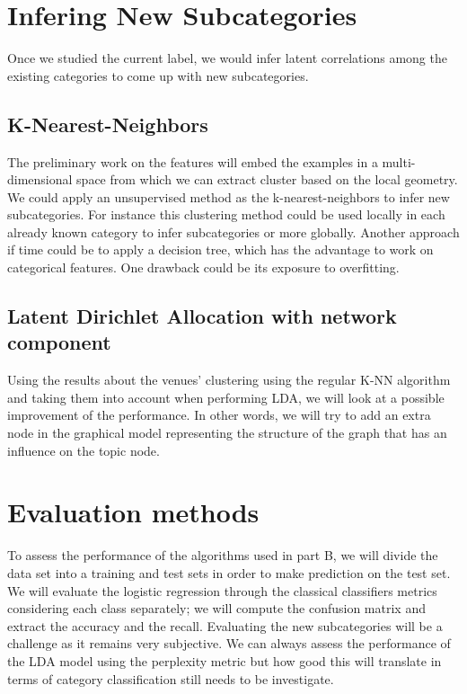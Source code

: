 \documentclass[submit]{harvardml}
\begin{document}
\section{Infering New Subcategories}

Once we studied the current label, we would infer latent correlations among the existing categories to come up with new subcategories.

\subsection{K-Nearest-Neighbors}
The preliminary work on the features will embed the examples in a multi-dimensional space from which we can extract cluster based on the local geometry. We could apply an unsupervised method as the k-nearest-neighbors to infer new subcategories. For instance this clustering method could be used locally in each already known category to infer subcategories or more globally. Another approach if time could be to apply a decision tree, which has the advantage to work on categorical features. One drawback could be its exposure to overfitting.

\subsection{Latent Dirichlet Allocation with network component}

Using the results about the venues' clustering using the regular K-NN algorithm and taking them into account when performing LDA, we will look at a possible improvement of the performance. In other words, we will try to add an extra node in the graphical model representing the structure of the graph that has an influence on the topic node.

\section{Evaluation methods}
 
To assess the performance of the algorithms used in part B, we will divide the data set into a training and test sets in order to make prediction on the test set. We will evaluate the logistic regression through the classical classifiers metrics considering each class separately; we will compute the confusion matrix and extract the accuracy and the recall. 
Evaluating the new subcategories will be a challenge as it remains very subjective. We can always assess the performance of the LDA model using the perplexity metric but how good this will translate in terms of category classification still needs to be investigate.
\end{document}
